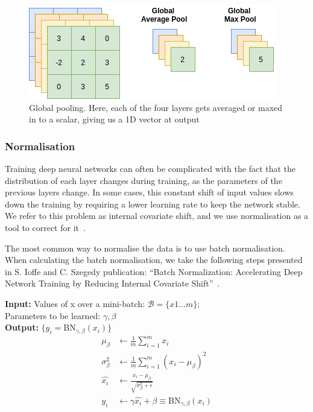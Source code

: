 \begin{figure}
        \centering
        \includegraphics[scale=0.7]{background/figures/GAP.png}
        \caption{Global pooling. Here, each of the four layers gets averaged or maxed in to a scalar, giving us a 1D vector at output}
        \label{fig:GAP}
\end{figure}

\subsubsection{Normalisation}
\label{cha:normalisation}
Training deep neural networks can often be complicated with the fact that the distribution of each layer changes during training, as the parameters of the previous layers change. In some cases, this constant shift of input values slows down the training by requiring a lower learning rate to keep the network stable.
We refer to this problem as internal covariate shift, and we use normalisation as a tool to correct for it~\cite{DBLP:journals/corr/IoffeS15}.

The most common way to normalise the data is to use batch normalisation. When calculating the batch normalisation, we take the following steps presented in S. Ioffe and C. Szegedy publication: ``Batch Normalization: Accelerating Deep Network Training by Reducing Internal Covariate Shift''~\cite{DBLP:journals/corr/IoffeS15}.\\

\begin{minipage}{\textwidth}	
\noindent \textbf{Input:} Values of x over a mini-batch: $\mathcal{B} = \{x1...m\}$;\\
\noindent Parameters to be learned: $\gamma, \beta$\\
\noindent \textbf{Output:} $\{y_i = \text{BN}_{\gamma,\beta}(x_i)\}$\\
\begin{align*}
\mu_{\beta} &\leftarrow \frac{1}{m} \sum_{i=1}^{m} x_i   \tag{mini-batch mean}\\
\sigma_{\beta}^2 &\leftarrow \frac{1}{m} \sum_{i=1}^{m} (x_i-\mu_{\beta})^2 \tag{mini-batch variance}\\
\widehat{x_i} &\leftarrow \frac{x_i - \mu_{\beta}}{\sqrt{\sigma_{\beta}^2+\epsilon}} \tag{normalise}\\
y_i &\leftarrow \gamma\widehat{x_i}  + \beta \equiv \text{BN}_{\gamma,\beta}(x_i) \tag{scale and shift}
\end{align*}
\label{eq:BN}
\end{minipage}

